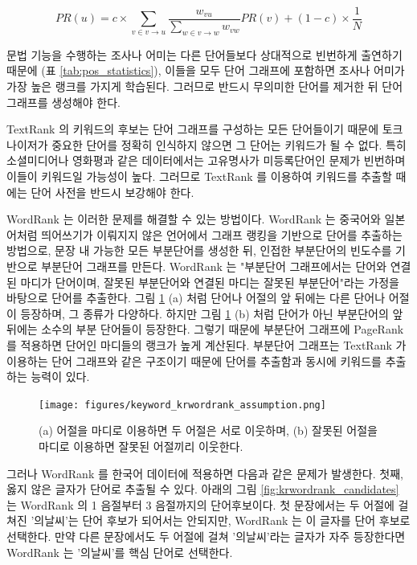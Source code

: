 \documentclass[11pt]{article}
\begin{document}
\begin{equation}
\label{eq:textrank_pagerank}
PR(u) = c \times \sum_{v \in v \rightarrow u} \frac{w_{vu}}{\sum_{w \in v \rightarrow w} w_{vw}} PR(v) + (1-c) \times \frac{1}{N}
\end{equation}

문법 기능을 수행하는 조사나 어미는 다른 단어들보다 상대적으로 빈번하게 출연하기 때문에 (표 \ref{tab:pos_statistics}), 이들을 모두 단어 그래프에 포함하면 조사나 어미가 가장 높은 랭크를 가지게 학습된다.
그러므로 반드시 무의미한 단어를 제거한 뒤 단어 그래프를 생성해야 한다.

TextRank 의 키워드의 후보는 단어 그래프를 구성하는 모든 단어들이기 때문에 토크나이저가 중요한 단어를 정확히 인식하지 않으면 그 단어는 키워드가 될 수 없다.
특히 소셜미디어나 영화평과 같은 데이터에서는 고유명사가 미등록단어인 문제가 빈번하며 이들이 키워드일 가능성이 높다.
그러므로 TextRank 를 이용하여 키워드를 추출할 때에는 단어 사전을 반드시 보강해야 한다.

WordRank \citep{chen2011simple} 는 이러한 문제를 해결할 수 있는 방법이다.
WordRank 는 중국어와 일본어처럼 띄어쓰기가 이뤄지지 않은 언어에서 그래프 랭킹을 기반으로 단어를 추출하는 방법으로, 문장 내 가능한 모든 부분단어를 생성한 뒤, 인접한 부분단어의 빈도수를 기반으로 부분단어 그래프를 만든다.
WordRank 는 "부분단어 그래프에서는 단어와 연결된 마디가 단어이며, 잘못된 부분단어와 연결된 마디는 잘못된 부분단어"라는 가정을 바탕으로 단어를 추출한다.
그림 \ref{fig:keyword_krwordrank_assumption} (a) 처럼 단어나 어절의 앞 뒤에는 다른 단어나 어절이 등장하며, 그 종류가 다양하다.
하지만 그림 \ref{fig:keyword_krwordrank_assumption} (b) 처럼 단어가 아닌 부분단어의 앞 뒤에는 소수의 부분 단어들이 등장한다.
그렇기 때문에 부분단어 그래프에 PageRank 를 적용하면 단어인 마디들의 랭크가 높게 계산된다.
부분단어 그래프는 TextRank 가 이용하는 단어 그래프와 같은 구조이기 때문에 단어를 추출함과 동시에 키워드를 추출하는 능력이 있다.

\begin{figure}[H]
\centering
\texttt{[image: figures/keyword\_krwordrank\_assumption.png]}
\caption{(a) 어절을 마디로 이용하면 두 어절은 서로 이웃하며, (b) 잘못된 어절을 마디로 이용하면 잘못된 어절끼리 이웃한다.}
\label{fig:keyword_krwordrank_assumption}
\end{figure}

그러나 WordRank 를 한국어 데이터에 적용하면 다음과 같은 문제가 발생한다.
첫째, 옳지 않은 글자가 단어로 추출될 수 있다.
아래의 그림 \ref{fig:krwordrank_candidates} 는 WordRank 의 1 음절부터 3 음절까지의 단어후보이다.
첫 문장에서는 두 어절에 걸쳐진 '의날씨'는 단어 후보가 되어서는 안되지만, WordRank 는 이 글자를 단어 후보로 선택한다.
만약 다른 문장에서도 두 어절에 걸쳐 '의날씨'라는 글자가 자주 등장한다면 WordRank 는 '의날씨'를 핵심 단어로 선택한다.
\end{document}
